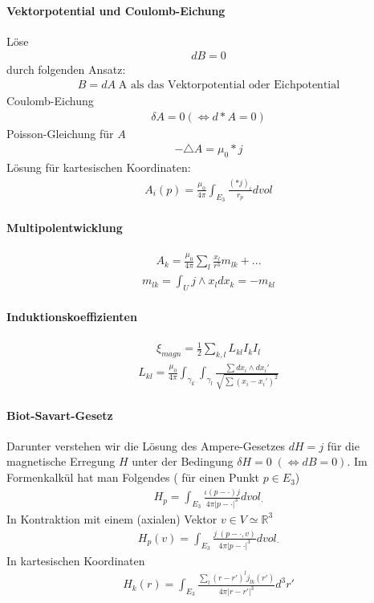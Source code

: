 \documentclass[10pt,a4paper]{article}
\begin{document}
\paragraph{Vektorpotential und Coulomb-Eichung} $\,$ \\
Löse
\begin{align}
dB=0
\end{align}
durch folgenden Ansatz:
\begin{align}
B=dA \; \text{A als das Vektorpotential oder Eichpotential}
\end{align}
Coulomb-Eichung
\begin{align}
\delta A =0 ( \Leftrightarrow d*A=0)
\end{align}
Poisson-Gleichung für $A$
\begin{align}
-\triangle A = \mu_0 * j
\end{align}
Lösung für kartesischen Koordinaten:
\begin{align}
A_i (p) = \frac{\mu_0}{4 \pi} \int_{E_3} \frac{(*j)_i}{r_p} dvol
\end{align}
\paragraph{Multipolentwicklung}
\begin{align}
A_k = \frac{\mu_0}{4 \pi} \sum_l \frac{x_l}{r^3} m_{lk}+...
\end{align}
\begin{align}
m_{lk}= \int_U j \wedge x_l dx_k=-m_{kl}
\end{align}
\paragraph{Induktionskoeffizienten}
\begin{align}
\xi_{magn}= \frac{1}{2} \sum_{k,l} L_{kl} I_k I_l
\end{align}
\begin{align}
L_{kl}= \frac{\mu_0}{4 \pi} \int_{\gamma_k} \int_{\gamma_l} \frac{\sum dx_i \wedge dx_i'}{\sqrt{\sum (x_i-x_i')^2}}
\end{align}
\paragraph{Biot-Savart-Gesetz} $\,$ \\
Darunter verstehen wir die Lösung des Ampere-Gesetzes $ dH=j$ für die magnetische Erregung $H$ unter der Bedingung $ \delta H=0 \; (\Leftrightarrow dB = 0) $. Im Formenkalkül hat man Folgendes ( für einen Punkt $ p \in E_3 $)
\begin{align}
H_p= \int_{E_3} \frac{\iota (p- \cdot ) j}{4 \pi \vert p- \cdot \vert^3} dvol_{\cdot}
\end{align}
In Kontraktion mit einem (axialen) Vektor $ v \in V \simeq \mathbb{R}^3 $
\begin{align}
H_p(v)= \int_{E_3} \frac{j_{\cdot} (p- \cdot , v)}{4 \pi \vert p- \cdot \vert^3} dvol_{\cdot}
\end{align}
In kartesischen Koordinaten
\begin{align}
H_k (r) = \int_{E_3} \frac{\sum_l (r-r')^l j_{lk} (r')}{4 \pi \vert r-r' \vert^3} d^3r'
\end{align}
\end{document}
